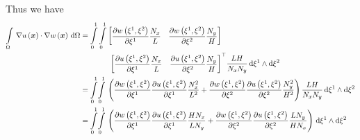 Thus we have
\begin{equation}
  \begin{aligned}
    \gint{\Omega}{}{\dotprod{\gradient{}{\fnof{u}{\vectr{x}}}}{\gradient{}{\fnof{w}{\vectr{x}}}}}{\Omega}
    &=\dintl{0}{1}\dintl{0}{1}\begin{bmatrix}
        \delby{\fnof{w}{\xione,\xitwo}}{\xione}\dfrac{N_{x}}{L}&\delby{\fnof{w}{\xione,\xitwo}}{\xitwo}\dfrac{N_{y}}{H}
    \end{bmatrix}\\
    &\qquad\qquad \transpose{\begin{bmatrix}
      \delby{\fnof{u}{\xione,\xitwo}}{\xione}\dfrac{N_{x}}{L}&\delby{\fnof{u}{\xione,\xitwo}}{\xitwo}\dfrac{N_{y}}{H}
    \end{bmatrix}}
    \dfrac{LH}{N_{x}N_{y}}\infinitesimaltwo{\xione}{\xitwo} \\
    &=\giint{0}{1}{0}{1}{\pbrac{\delby{\fnof{w}{\xione,\xitwo}}{\xione}\delby{\fnof{u}{\xione,\xitwo}}{\xione}
        \dfrac{N_{x}^{2}}{L^{2}}+\delby{\fnof{w}{\xione,\xitwo}}{\xitwo}\delby{\fnof{u}{\xione,\xitwo}}{\xitwo}
        \dfrac{N_{y}^{2}}{H^{2}}}\dfrac{LH}{N_{x}N_{y}}}{\xione}{\xitwo} \\
    &=\giint{0}{1}{0}{1}{\pbrac{\delby{\fnof{w}{\xione,\xitwo}}{\xione}\delby{\fnof{u}{\xione,\xitwo}}{\xione}
        \dfrac{H N_{x}}{L N_{y}}+\delby{\fnof{w}{\xione,\xitwo}}{\xitwo}\delby{\fnof{u}{\xione,\xitwo}}{\xitwo}
        \dfrac{L N_{y}}{H N_{x}}}}{\xione}{\xitwo}
  \end{aligned}
\end{equation}

